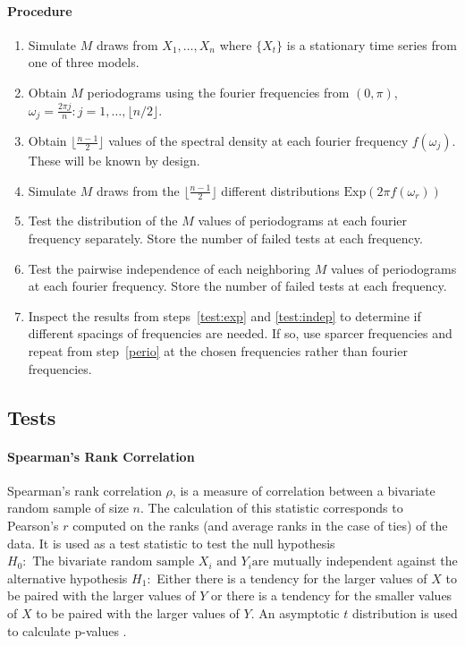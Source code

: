 \documentclass{article}\usepackage{graphicx, color}
\theoremstyle{plain}
\begin{document}
\paragraph{Procedure}
\begin{enumerate}
\item Simulate $M$ draws from $X_1,\dots, X_n$ where $\{X_t\}$ is a stationary time series from one of three models.
\item \label{perio}Obtain $M$ periodograms using the fourier frequencies from $(0, \pi)$, $\omega_j = \frac{2\pi j}{n}: j = 1, \dots, \lfloor n/2 \rfloor$.
\item Obtain $\lfloor\frac{n-1}{2}\rfloor$ values of the spectral density at each fourier frequency $f(\omega_j)$. These will be known by design.
\item Simulate $M$ draws from the $\lfloor\frac{n-1}{2}\rfloor$ different distributions $\text{Exp}(2\pi f(\omega_r))$
\item \label{test:exp}Test the distribution of the $M$ values of periodograms at each fourier frequency separately. Store the number of failed tests at each frequency.
\item \label{test:indep}Test the pairwise independence of each neighboring $M$ values of periodograms at each fourier frequency. Store the number of failed tests at each frequency.
\item Inspect the results from steps~\ref{test:exp} and \ref{test:indep} to determine if different spacings of frequencies are needed. If so, use sparcer frequencies and repeat from step~\ref{perio} at the chosen frequencies rather than fourier frequencies.
\end{enumerate}


\subsection{Tests}



\paragraph{Spearman's Rank Correlation}
Spearman's rank correlation $\rho$, is a measure of correlation between a bivariate random sample of size $n$. The calculation of this statistic corresponds to Pearson's $r$ computed on the ranks (and average ranks in the case of ties) of the data. It is used as a test statistic to test the null hypothesis $H_0: \text{ The bivariate random sample } X_i \text{ and } Y_i \text{are mutually independent}$ against the alternative hypothesis $H_1:$ Either there is a tendency for the larger values of $X$ to be paired with the larger values of $Y$ or there is a tendency for the smaller values of $X$ to be paired with the larger values of $Y$. An asymptotic $t$ distribution is used to calculate p-values \cite{conover1998practical}.
\end{document}
